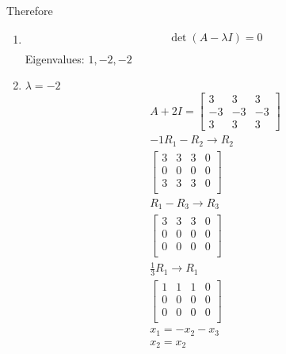 \documentclass[12pt letter]{report}
\begin{document}
{{    Therefore\\
    \begin{enumerate}
      \item
            \begin{align*}
              \det \left( A - \lambda I \right)  = 0 \\
            \end{align*}
            Eigenvalues: $1, -2, -2$
      \item
            $\lambda  = -2$
            \begin{align*}
              A + 2 I  =  \begin{bmatrix}
                            3  & 3  & 3  \\
                            -3 & -3 & -3 \\
                            3  & 3  & 3
                          \end{bmatrix}   \\
              -1R_1 - R_2  \rightarrow R_2 \\
              \begin{bmatrix}
                3 & 3 & 3 & 0 \\
                0 & 0 & 0 & 0 \\
                3 & 3 & 3 & 0 \\
              \end{bmatrix}
              \\
              R_1 - R_3  \rightarrow R_3   \\
              \begin{bmatrix}
                3 & 3 & 3 & 0 \\
                0 & 0 & 0 & 0 \\
                0 & 0 & 0 & 0 \\
              \end{bmatrix}
              \\
              \frac{1}{3}R_1 \to R_1       \\
              \begin{bmatrix}
                1 & 1 & 1 & 0 \\
                0 & 0 & 0 & 0 \\
                0 & 0 & 0 & 0 \\
              \end{bmatrix}
              \\
              x_1 = -x_2 - x_3             \\
              x_2 = x_2                    \\

\end{align*}
\end{enumerate}}}
\end{document}
